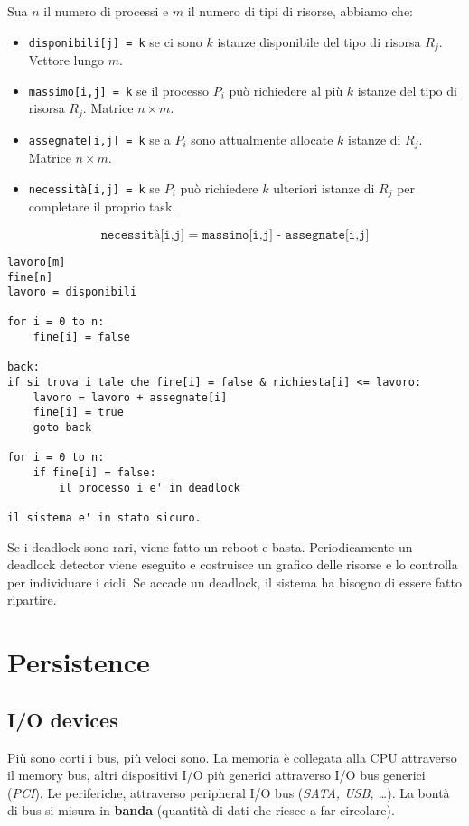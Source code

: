 \documentclass[12pt, twoside, letterpaper]{article}
\begin{document}
				Sua $n$ il numero di processi e $m$ il numero di tipi di risorse, abbiamo che:
				\begin{itemize}
					\item \texttt{disponibili[j] = k} se ci sono $k$ istanze disponibile del tipo di risorsa $R_j$. Vettore lungo $m$.
					\item \texttt{massimo[i,j] = k} se il processo $P_i$ può richiedere al più $k$ istanze del tipo di risorsa $R_j$. Matrice $n \times m$.
					\item \texttt{assegnate[i,j] = k} se a $P_i$ sono attualmente allocate $k$ istanze di $R_j$. Matrice $n \times m$.
					\item \texttt{necessità[i,j] = k} se $P_i$ può richiedere $k$ ulteriori istanze di $R_j$ per completare il proprio task. 
				\end{itemize}
				$$\texttt{necessità[i,j] = massimo[i,j] - assegnate[i,j]}$$
				
				\begin{lstlisting}[style=CStyle]
lavoro[m]
fine[n]
lavoro = disponibili

for i = 0 to n:
	fine[i] = false

back:
if si trova i tale che fine[i] = false & richiesta[i] <= lavoro:
	lavoro = lavoro + assegnate[i]
	fine[i] = true
	goto back
	
for i = 0 to n:
	if fine[i] = false:
		il processo i e' in deadlock

il sistema e' in stato sicuro.				\end{lstlisting}
				Se i deadlock sono rari, viene fatto un reboot e basta. Periodicamente un deadlock detector viene eseguito e costruisce un grafico delle risorse e lo controlla per individuare i cicli. Se accade un deadlock, il sistema ha bisogno di essere fatto ripartire.


				

				
			
\newpage	
	\section{Persistence}
		
		\subsection{I/O devices}
			Più sono corti i bus, più veloci sono. La memoria è collegata alla CPU attraverso il memory bus, altri dispositivi I/O più generici attraverso I/O bus generici (\textit{PCI}). Le periferiche, attraverso peripheral I/O bus (\textit{SATA, USB, \dots}). La bontà di bus si misura in \textbf{banda} (quantità di dati che riesce a far circolare).
			
\end{document}
